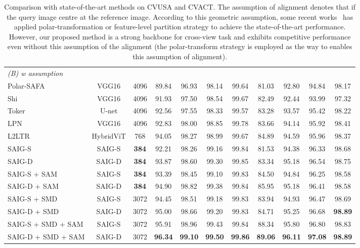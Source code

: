 \documentclass[sn-basic,iicol]{sn-jnl}
\theoremstyle{thmstyletwo}\newtheorem{example}{Example}\newtheorem{remark}{Remark}
\theoremstyle{thmstylethree}\newtheorem{definition}{Definition}
\begin{document}
\begin{table*}
\begin{tabular}{lcccccccccc}
\midrule
\multicolumn{5}{l}{\emph{(B) w assumption}}&&&&&&\\
Polar-SAFA& VGG16  & 4096 &89.84&96.93&98.14&99.64&81.03&92.80&94.84&98.17\\
Shi& VGG16  & 4096 &91.93&97.50&98.54&99.67&82.49&92.44&93.99&97.32\\
Toker& U-net  & 4096 &92.56&97.55&98.33&99.57&83.28&93.57&95.42&98.22\\
LPN& VGG16  & 4096 &92.83&98.00&98.85&99.78&83.66&94.14&95.92&98.41\\
L2LTR & HybridViT  & 768 & 94.05 & 98.27&98.99&99.67&{84.89}&94.59&95.96&98.37\\ 
\toprule
SAIG-S  & SAIG-S & \textbf{384} & 92.21 & 98.26 & 99.16 & 99.84 &81.53 &94.38&96.33&98.68 \\
SAIG-D & SAIG-D & \textbf{384} & 93.87 & 98.60 & {99.30} & {99.85} & 83.34 & {95.18} & {96.54} & {98.75}\\

SAIG-S + SAM & SAIG-S & \textbf{384} & 93.39 & 98.45 & 99.10 & 99.83 & 84.50 & 94.84 & 96.25 & 98.58 \\
SAIG-D + SAM & SAIG-D & \textbf{384} & {94.90} & {98.82} & {99.38} & 99.84 & {85.95} & {95.18} & 96.41 & 98.58 \\ 
\toprule
SAIG-S + SMD & SAIG-S & 3072 & 94.45 & 98.51 & 99.18 & 99.83 & 83.94 & 94.93 & 96.47 & 98.69 \\
SAIG-D + SMD  & SAIG-D & 3072 &{95.00}&{98.66}&99.20&99.83&84.71&{95.25}&{96.68}&\textbf{98.89}\\ 
SAIG-S + SMD + SAM  & SAIG-S & 3072 &{95.91}&{98.96}& {99.43} & {99.84} &{88.34}&{95.80}&{96.80}&{98.83}\\
SAIG-D + SMD + SAM & SAIG-D  & 3072 &\textbf{96.34}&\textbf{99.10}& \textbf{99.50} & \textbf{99.86} &\textbf{89.06}&\textbf{96.11}&\textbf{97.08}&\textbf{98.89}\\
\bottomrule
\end{tabular}
\caption{Comparison with state-of-the-art methods on CVUSA and CVACT. The assumption of alignment denotes that if the query image centre at the reference image. According to this geometric assumption, some recent works~\protect\citep{SAFA2019,wang2021LPN} has applied polar-transformation or feature-level partition strategy to achieve the state-of-the-art performance. However, our proposed method is a strong backbone for cross-view task and exhibits competitive performance even without this assumption of the alignment (the polar-transform strategy is employed as the way to enables this assumption of alignment).}
\label{CVUSA and CVACT}
\end{table*}
\end{document}
